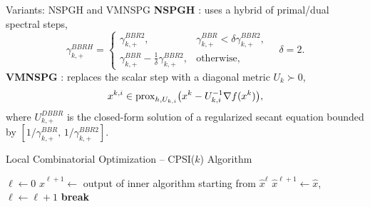 \begin{frame}{Variants: NSPGH and VMNSPG}
\textbf{NSPGH} \cite{hibrido1,hibrido2}: uses a hybrid of primal/dual spectral steps,
\begin{equation} \label{BBR2}
\gamma^{BBRH}_{k,+} = 
\begin{cases}
\gamma^{BBR2}_{k,+}, & \gamma^{BBR}_{k,+} < \delta \gamma^{BBR2}_{k,+},\\
\gamma^{BBR}_{k,+} - \frac{1}{\delta} \gamma^{BBR2}_{k,+}, & \text{otherwise},
\end{cases}
\quad \delta=2.
\end{equation}
\textbf{VMNSPG} \cite{vmspg}: replaces the scalar step with a diagonal metric $U_k \succ 0$,
\[
x^{k,i} \in \operatorname{prox}_{h, U_{k,i}}\bigl(x^k - U_{k,i}^{-1} \nabla f(x^k)\bigr),
\]
where $U_{k,+}^{DBBR}$ is the closed-form solution of a regularized secant equation bounded by $[1/\gamma^{BBR}_{k,+},\, 1/\gamma^{BBR2}_{k,+}]$.
\end{frame}

\begin{frame}{Local Combinatorial Optimization – CPSI($k$) Algorithm}
\begin{algorithm}[H]
\caption{CPSI($k$) Method}
\begin{algorithmic}[1]
\State $\ell \gets 0$
\State $\hat{x}^{\ell+1} \gets$ output of inner algorithm starting from $\hat{x}^\ell$
\State $\hat{x}^{\ell+1} \gets \hat{x}$, $\ell \gets \ell+1$
\Else \textbf{break}
\EndIf
\EndWhile
{}
\end{algorithmic}
\end{algorithm}
\end{frame}
